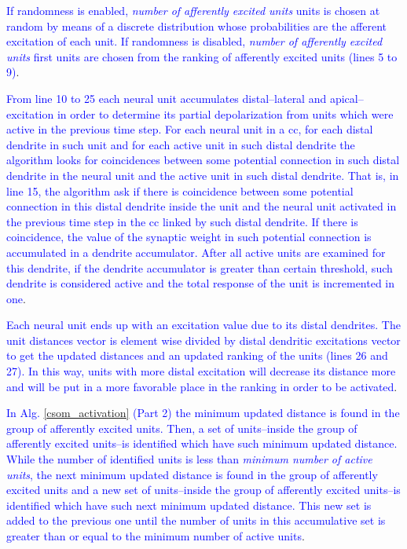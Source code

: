 \documentclass[10pt,letterpaper]{article}
\begin{document}
\textcolor{blue}{If randomness is enabled, \emph{number of afferently excited units} units is chosen at random by means of a discrete distribution whose probabilities are the afferent excitation of each unit. If randomness is disabled, \emph{number of afferently excited units} first units are chosen from the ranking of afferently excited units (lines 5 to 9)}.

\textcolor{blue}{From line 10 to 25 each neural unit accumulates distal--lateral and apical--excitation in order to determine its partial depolarization from units which were active in the previous time step. For each neural unit in a \gls{cc}, for each distal dendrite in such unit and for each active unit in such distal dendrite the algorithm looks for coincidences between some potential connection in such distal dendrite in the neural unit and the active unit in such distal dendrite. That is, in line 15, the algorithm ask if there is coincidence between some potential connection in this distal dendrite inside the unit and the neural unit activated in the previous time step in the \gls{cc} linked by such distal dendrite. If there is coincidence, the value of the synaptic weight in such potential connection is accumulated in a dendrite accumulator. After all active units are examined for this dendrite, if the dendrite accumulator is greater than certain threshold, such dendrite is considered active and the total response of the unit is incremented in one}.

\textcolor{blue}{Each neural unit ends up with an excitation value due to its distal dendrites. The unit distances vector is element wise divided by distal dendritic excitations vector to get the updated distances and an updated ranking of the units (lines 26 and 27). In this way, units with more distal excitation will decrease its distance more and will be put in a more favorable place in the ranking in order to be activated}.

\textcolor{blue}{In Alg. \ref{csom_activation} (Part 2) the minimum updated distance is found in the group of afferently excited units. Then, a set of units--inside the group of afferently excited units--is identified which have such minimum updated distance. While the number of identified units is less than \emph{minimum number of active units}, the next   minimum updated distance is found in the group of afferently excited units and a new set of units--inside the group of afferently excited units--is identified which have such next minimum updated distance. This new set is added to the previous one until the number of units in this accumulative set is greater than or equal to the minimum number of active units}.
\end{document}
